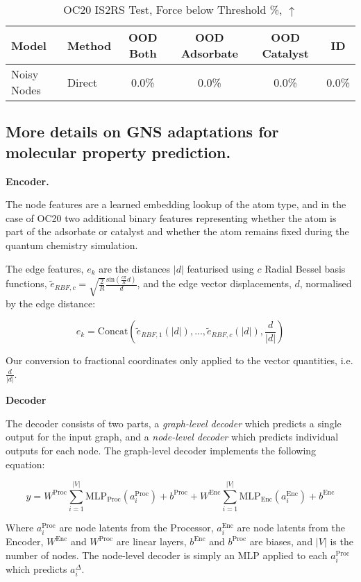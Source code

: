 \documentclass{article} \usepackage{iclr2022_conference,times}
\begin{document}
\begin{table}
\caption{OC20 IS2RS Test, Force below Threshold \%, $\uparrow$}
\label{tab:IS2RS_force_2}
\centering
\begin{tabular}{llcccc}
  \toprule
  Model & Method & OOD Both & OOD Adsorbate & OOD Catalyst & ID \\
  \midrule
  Noisy Nodes & Direct & 0.0\% & 0.0\% & 0.0\% & 0.0\% \\
  \bottomrule
\end{tabular}
\end{table}

\subsection{More details on GNS adaptations for molecular property prediction.}

\textbf{Encoder.}

The node features are a learned embedding lookup of the atom type, and in the case of OC20 two additional binary features representing whether the atom is part of the adsorbate or catalyst and whether the atom remains fixed during the quantum chemistry simulation.

The edge features, $e_{k}$ are the distances $|d|$ featurised using $c$ Radial Bessel basis functions, $\tilde{e}_{RBF,c} = \sqrt{\frac{2}{R}}\frac{\text{sin}(\frac{c\pi}{R}d)}{d}$, and the edge vector displacements, $d$, normalised by the edge distance:

\[
e_{k} = \text{Concat}(\tilde{e}_{RBF,1}(|d|),\text{...},\tilde{e}_{RBF,c}(|d|), \frac{d}{|d|}) 
\]

Our conversion to fractional coordinates only applied to the vector quantities, i.e. $\frac{d}{|d|}$.

\textbf{Decoder}

The decoder consists of two parts, a \textit{graph-level decoder} which predicts a single output for the input graph, and a \textit{node-level decoder} which predicts individual outputs for each node. The graph-level decoder implements the following equation:

\[
y = W^{\text{Proc}}\sum_{i=1}^{|V|} \text{MLP}_{\text{Proc}}(a_i^{\text{Proc}}) + b^{\text{Proc}} + W^{\text{Enc}}\sum_{i=1}^{|V|} \text{MLP}_{\text{Enc}}(a_i^{\text{Enc}}) + b^{\text{Enc}}
\]

Where $a_i^{\text{Proc}}$ are node latents from the Processor, $a_i^{\text{Enc}}$ are node latents from the Encoder, $W^{\text{Enc}}$ and $W^{\text{Proc}}$ are linear layers, $b^{\text{Enc}}$ and $b^{\text{Proc}}$ are biases, and $|V|$ is the number of nodes. The node-level decoder is simply an MLP applied to each $a_i^{\text{Proc}}$ which predicts $a_i^{\Delta}$.
\end{document}
